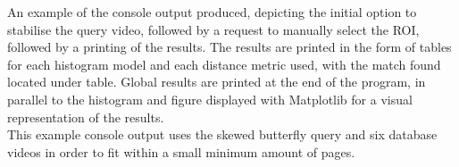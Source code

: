 An example of the console output produced, depicting the initial option to stabilise the query video, followed by a request to manually select the ROI, followed by a printing of the results. The results are printed in the form of tables for each histogram model and each distance metric used, with the match found located under table. Global results are printed at the end of the program, in parallel to the histogram and figure displayed with Matplotlib for a visual representation of the results.\\

This example console output uses the skewed butterfly query and six database videos in order to fit within a small minimum amount of pages.

